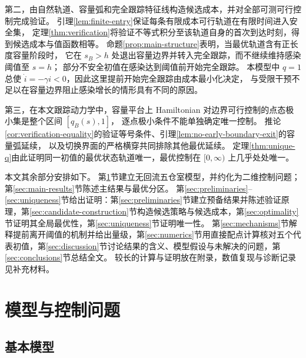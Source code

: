 \documentclass[11pt,a4paper,UTF8]{ctexart}
\theoremstyle{definition}
\begin{document}
第二，由自然轨道、容量弧和完全跟踪特征线构造候选成本，并对全部可测可行控制完成验证。
引理\ref{lem:finite-entry}保证每条有限成本可行轨道在有限时间进入安全集，
定理\ref{thm:verification}将验证不等式积分至该轨道自身的首次到达时刻，得到候选成本与值函数相等。
命题\ref{prop:main-structure}表明，当最优轨道含有正长度容量阶段时，
它在 $s_B>h$ 处退出容量边界并转入完全跟踪，而不继续维持感染阈值至 $s=h$；
部分不安全初值在感染达到阈值前开始完全跟踪。
本模型中 $q=1$ 总使 $\dot i=-\gamma i<0$，因此这里提前开始完全跟踪由成本最小化决定，
与受限干预不足以在容量边界阻止感染增长的情形具有不同的原因。

第三，在本文跟踪动力学中，容量平台上 Hamiltonian 对边界可行控制的点态极小集是整个区间 $[q_B(s),1]$，
逐点极小条件不能单独确定唯一控制。
推论\ref{cor:verification-equality}的验证等号条件、引理\ref{lem:no-early-boundary-exit}的容量弧延续，
以及切换界面的严格横穿共同排除其他最优延续。
定理\ref{thm:unique-q}由此证明同一初值的最优状态轨道唯一，最优控制在 $[0,\infty)$ 上几乎处处唯一。

本文其余部分安排如下。
第\ref{sec:model}节建立无回流五仓室模型，并约化为二维控制问题；第\ref{sec:main-results}节陈述主结果与最优分区。
第\ref{sec:preliminaries}--\ref{sec:uniqueness}节给出证明：第\ref{sec:preliminaries}节建立预备结果并陈述验证原理，第\ref{sec:candidate-construction}节构造候选策略与候选成本，第\ref{sec:optimality}节证明其全局最优性，第\ref{sec:uniqueness}节证明唯一性。
第\ref{sec:mechanisms}节解释提前离开阈值的机制并给出量级，第\ref{sec:numerics}节用直接配点计算核对五个代表初值，第\ref{sec:discussion}节讨论结果的含义、模型假设与未解决的问题，第\ref{sec:conclusions}节总结全文。
较长的计算与证明放在附录，数值复现与诊断记录见补充材料。


\section{模型与控制问题}
\label{sec:model}

\subsection{基本模型}
\end{document}
